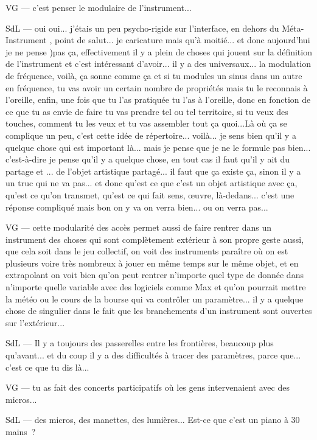 VG — c'est penser le modulaire de l'instrument... 

SdL — oui oui... j'étais un peu psycho-rigide sur l'interface, en dehors du Méta-Instrument , point de salut... je caricature mais qu'à moitié... et donc aujourd'hui je ne pense )pas ça, effectivement il y a plein de choses qui jouent sur la définition de l'instrument et c'est intéressant d'avoir... il y a des universaux... la modulation de fréquence, voilà, ça sonne comme ça et si tu modules un sinus dans un autre en fréquence, tu vas avoir un certain nombre de propriétés mais tu le reconnais à l'oreille, enfin, une fois que tu l'as pratiquée tu l'as à l'oreille, donc en fonction de ce que tu as envie de faire tu vas prendre tel ou tel territoire, si tu veux des touches, comment tu les veux et tu vas assembler tout ça quoi...Là où ça se complique un peu, c'est cette idée de répertoire... voilà... je sens bien qu'il y a quelque chose qui est important là... mais je pense que je ne le formule pas bien... c'est-à-dire je pense qu'il y a quelque chose, en tout cas il faut qu'il y ait du partage et ... de l'objet artistique partagé... il faut que ça existe ça, sinon il y a un truc qui ne va pas... et donc qu'est ce que c'est un objet artistique avec ça, qu'est ce qu'on transmet, qu'est ce qui fait sens, œuvre, là-dedans... c'est une réponse compliqué mais bon on y va on verra bien... ou on verra pas... 

VG — cette modularité des accès permet aussi de faire rentrer dans un instrument des choses qui sont complètement extérieur à son propre geste aussi, que cela soit dans le jeu collectif, on voit des instruments paraître où on est plusieurs voire très nombreux à jouer en même temps sur le même objet, et en extrapolant on voit bien qu'on peut rentrer n'importe quel type de donnée dans n'importe quelle variable avec des logiciels comme Max et qu'on pourrait mettre la météo ou le cours de la bourse qui va contrôler un paramètre... il y a quelque chose de singulier dans le fait que les branchements d'un instrument sont ouvertes sur l'extérieur... 

SdL — Il y a toujours des passerelles entre les frontières, beaucoup plus qu'avant... et du coup il y a des difficultés à tracer des paramètres, parce que... c'est ce que tu dis là... 

VG — tu as fait des concerts participatifs où les gens intervenaient avec des micros... 

SdL — des micros, des manettes, des lumières... Est-ce que c'est un piano à 30 mains ? 

